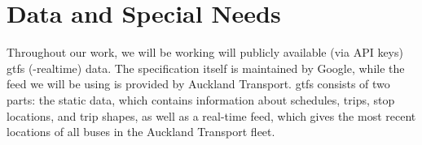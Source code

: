 \documentclass[12pt,a4paper]{article}
\begin{document}
\section{Data and Special Needs}
\label{sec:data}























Throughout our work, we will be working will publicly available (via API keys) \gls{gtfs}
(-realtime) data.
The specification itself is maintained by Google, 
while the feed we will be using is provided by Auckland Transport.
\gls{gtfs} consists of two parts:
the static data, which contains information about schedules, trips, stop locations,
and trip shapes, as well as a real-time feed, which gives the most recent locations
of all buses in the Auckland Transport fleet.
\end{document}
